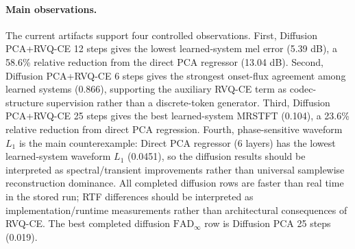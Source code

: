 \paragraph{Main observations.}
The current artifacts support four controlled observations.
First, Diffusion PCA+RVQ-CE 12 steps gives the lowest learned-system mel error (5.39 dB), a 58.6\% relative reduction from the direct PCA regressor (13.04 dB).
Second, Diffusion PCA+RVQ-CE 6 steps gives the strongest onset-flux agreement among learned systems (0.866), supporting the auxiliary RVQ-CE term as codec-structure supervision rather than a discrete-token generator.
Third, Diffusion PCA+RVQ-CE 25 steps gives the best learned-system MRSTFT (0.104), a 23.6\% relative reduction from direct PCA regression.
Fourth, phase-sensitive waveform $L_1$ is the main counterexample: Direct PCA regressor (6 layers) has the lowest learned-system waveform $L_1$ (0.0451), so the diffusion results should be interpreted as spectral/transient improvements rather than universal samplewise reconstruction dominance.
All completed diffusion rows are faster than real time in the stored run; RTF differences should be interpreted as implementation/runtime measurements rather than architectural consequences of RVQ-CE.
The best completed diffusion $\mathrm{FAD}_{\infty}$ row is Diffusion PCA 25 steps (0.019).
